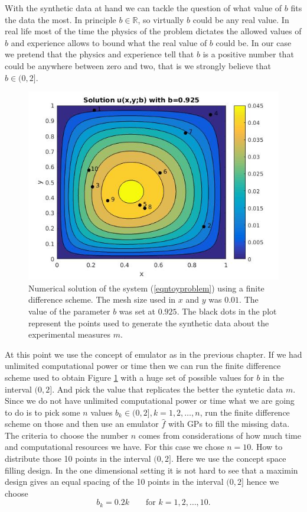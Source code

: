 \documentclass[12pt]{book}
\begin{document}
\newpage
With the synthetic data at hand we can tackle the question of what value of $b$ fits the data the most.
In principle $b\in\mathbb{R}$, so virtually $b$ could be any real value. In real life most of the time
the physics of the problem dictates the allowed values of $b$ and experience allows to bound
what the real value of $b$ could be. In our case we pretend that the physics
and experience tell that   $b$ is a positive number that  could be  anywhere between
zero and two, that is we strongly believe that $b\in (0,2]$.


\begin{figure}[H]
\centering
\includegraphics[scale=0.5]{./FigChap3/solu}
\caption{Numerical solution of the system (\ref{eqntoyproblem}) using a finite difference scheme. The mesh
size used in $x$ and $y$ was $0.01$. The value of the parameter $b$ was set at $0.925$. The black dots
in the plot represent the points used to generate the synthetic data about the experimental
measures $m$.}
\label{figsolU}
\end{figure}


At this point  we use the concept of emulator as in the previous chapter. If we had unlimited computational
power or time then we can run the finite difference scheme used to obtain Figure \ref{figsolU} with
a huge set of possible values for $b$ in the interval $(0,2]$. And pick the value that replicates the
better the syntetic data $m$. Since we do not have unlimited computational power or time what we
are going to do is to pick some $n$  values $b_{k}\in (0,2], k=1,2,\ldots,n$, run the finite difference
scheme on those and then use an emulator $\hat{f}$ with GPs to fill the missing data. The criteria to 
choose the number $n$ comes from considerations of how much time and computational resources we have.
For this case we chose $n=10$. How to distribute those 10 points in the interval $(0,2]$. Here we
use the concept space filling design. In the one dimensional setting it is not hard to see that
a maximin design gives an equal spacing of the 10 points in the interval $(0,2]$ hence we choose
\begin{equation*}
b_{k}=0.2k \qquad\text{for }k=1,2,\ldots,10.
\end{equation*}
\end{document}

